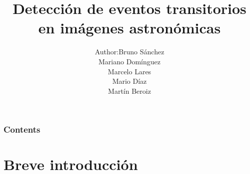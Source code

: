 \documentclass[10pt]{beamer}
\begin{document}
\title[Im\'agenes astron\'omicas]
{Detecci\'on de eventos transitorios en im\'agenes astron\'omicas}
\author{\begin{tabular}{r@{ }l} 
Author:      & Bruno S\'anchez \\[1ex]   & Mariano Dom\'{i}nguez\\ & Marcelo Lares\\ & Mario D\'{i}az \\ & Mart\'{i}n Beroiz%
\end{tabular}}

\frame{\titlepage}
\begin{frame}
\frametitle{Contents}
\tableofcontents%
\end{frame}
\section{Breve introducci\'on}
\frame{
\tableofcontents[ 
    currentsection, 
    sectionstyle=show/hide, 
    sectionstyle=show/shaded, 
    ]}
\end{document}
